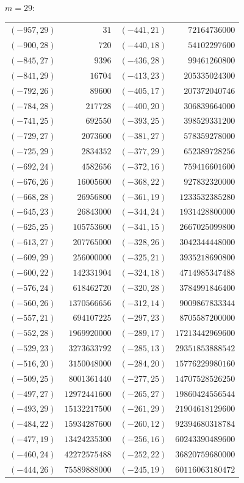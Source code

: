 \documentclass[11pt]{amsart}
\theoremstyle{definition}
\begin{document}
\noindent$m=29$:\nopagebreak\\[2pt]
{\scriptsize\begin{tabular}{@{}r@{\ \ }r@{\qquad}r@{\ \ }r@{}}
$(-957,29)$ & $31$ & $(-441,21)$ & $72164736000$ \\
$(-900,28)$ & $720$ & $(-440,18)$ & $54102297600$ \\
$(-845,27)$ & $9396$ & $(-436,28)$ & $99461260800$ \\
$(-841,29)$ & $16704$ & $(-413,23)$ & $205335024300$ \\
$(-792,26)$ & $89600$ & $(-405,17)$ & $207372040746$ \\
$(-784,28)$ & $217728$ & $(-400,20)$ & $306839664000$ \\
$(-741,25)$ & $692550$ & $(-393,25)$ & $398529331200$ \\
$(-729,27)$ & $2073600$ & $(-381,27)$ & $578359278000$ \\
$(-725,29)$ & $2834352$ & $(-377,29)$ & $652389728256$ \\
$(-692,24)$ & $4582656$ & $(-372,16)$ & $759416601600$ \\
$(-676,26)$ & $16005600$ & $(-368,22)$ & $927832320000$ \\
$(-668,28)$ & $26956800$ & $(-361,19)$ & $1233532385280$ \\
$(-645,23)$ & $26843000$ & $(-344,24)$ & $1931428800000$ \\
$(-625,25)$ & $105753600$ & $(-341,15)$ & $2667025099800$ \\
$(-613,27)$ & $207765000$ & $(-328,26)$ & $3042344448000$ \\
$(-609,29)$ & $256000000$ & $(-325,21)$ & $3935218690800$ \\
$(-600,22)$ & $142331904$ & $(-324,18)$ & $4714985347488$ \\
$(-576,24)$ & $618462720$ & $(-320,28)$ & $3784991846400$ \\
$(-560,26)$ & $1370566656$ & $(-312,14)$ & $9009867833344$ \\
$(-557,21)$ & $694107225$ & $(-297,23)$ & $8705587200000$ \\
$(-552,28)$ & $1969920000$ & $(-289,17)$ & $17213442969600$ \\
$(-529,23)$ & $3273633792$ & $(-285,13)$ & $29351853888542$ \\
$(-516,20)$ & $3150048000$ & $(-284,20)$ & $15776229980160$ \\
$(-509,25)$ & $8001361440$ & $(-277,25)$ & $14707528526250$ \\
$(-497,27)$ & $12972441600$ & $(-265,27)$ & $19860424556544$ \\
$(-493,29)$ & $15132217500$ & $(-261,29)$ & $21904618129600$ \\
$(-484,22)$ & $15934287600$ & $(-260,12)$ & $92394680318784$ \\
$(-477,19)$ & $13424235300$ & $(-256,16)$ & $60243390489600$ \\
$(-460,24)$ & $42272575488$ & $(-252,22)$ & $36820759680000$ \\
$(-444,26)$ & $75589888000$ & $(-245,19)$ & $60116063180472$ \\
\end{tabular}}\par
\end{document}
